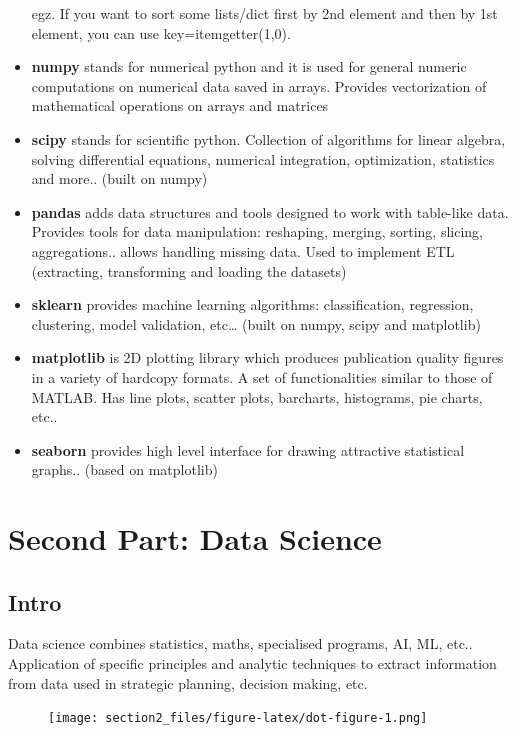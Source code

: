 \documentclass[
  letterpaper,
]{book}
\begin{document}
\begin{itemize}
  egz. If you want to sort some lists/dict first by 2nd element and then
  by 1st element, you can use key=itemgetter(1,0).
\item
  \textbf{numpy} stands for numerical python and it is used for general
  numeric computations on numerical data saved in arrays. Provides
  vectorization of mathematical operations on arrays and matrices
\item
  \textbf{scipy} stands for scientific python. Collection of algorithms
  for linear algebra, solving differential equations, numerical
  integration, optimization, statistics and more.. (built on numpy)
\item
  \textbf{pandas} adds data structures and tools designed to work with
  table-like data. Provides tools for data manipulation: reshaping,
  merging, sorting, slicing, aggregations.. allows handling missing
  data. Used to implement ETL (extracting, transforming and loading the
  datasets)
\item
  \textbf{sklearn} provides machine learning algorithms: classification,
  regression, clustering, model validation, etc\ldots{} (built on numpy,
  scipy and matplotlib)
\item
  \textbf{matplotlib} is 2D plotting library which produces publication
  quality figures in a variety of hardcopy formats. A set of
  functionalities similar to those of MATLAB. Has line plots, scatter
  plots, barcharts, histograms, pie charts, etc..
\item
  \textbf{seaborn} provides high level interface for drawing attractive
  statistical graphs.. (based on matplotlib)
\end{itemize}

\hypertarget{second-part-data-science}{%
\chapter{Second Part: Data Science}\label{second-part-data-science}}

\hypertarget{intro-1}{%
\section{Intro}\label{intro-1}}

Data science combines statistics, maths, specialised programs, AI, ML,
etc.. Application of specific principles and analytic techniques to
extract information from data used in strategic planning, decision
making, etc.

\begin{figure}[H]

{\centering \texttt{[image: section2\_files/figure-latex/dot-figure-1.png]}

}

\end{figure}
\end{document}

